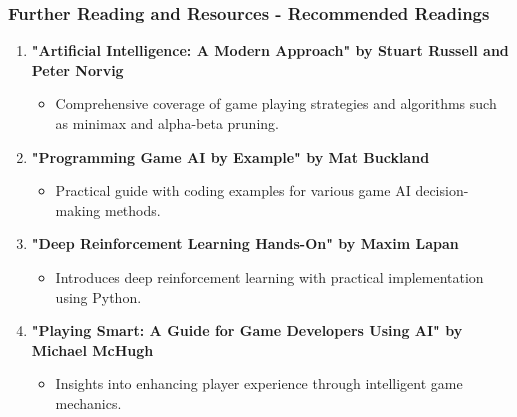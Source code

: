 \documentclass[aspectratio=169]{beamer}
\begin{document}
\begin{frame}[fragile]
    \frametitle{Further Reading and Resources - Recommended Readings}
    \begin{enumerate}
        \item \textbf{"Artificial Intelligence: A Modern Approach" by Stuart Russell and Peter Norvig}
            \begin{itemize}
                \item Comprehensive coverage of game playing strategies and algorithms such as minimax and alpha-beta pruning.
            \end{itemize}
        \item \textbf{"Programming Game AI by Example" by Mat Buckland}
            \begin{itemize}
                \item Practical guide with coding examples for various game AI decision-making methods.
            \end{itemize}
        \item \textbf{"Deep Reinforcement Learning Hands-On" by Maxim Lapan}
            \begin{itemize}
                \item Introduces deep reinforcement learning with practical implementation using Python.
            \end{itemize}
        \item \textbf{"Playing Smart: A Guide for Game Developers Using AI" by Michael McHugh}
            \begin{itemize}
                \item Insights into enhancing player experience through intelligent game mechanics.
            \end{itemize}
    \end{enumerate}
\end{frame}
\end{document}
